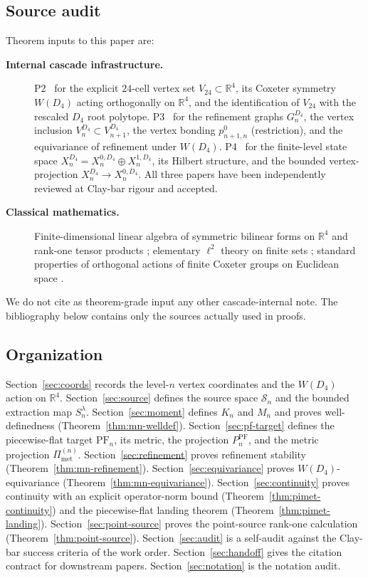 \documentclass[11pt, a4paper]{amsart}
\theoremstyle{definition}
\newcommand{\R}{\mathbb{R}}
\newcommand{\Met}{\mathrm{met}}
\newcommand{\PF}{\mathrm{PF}}
\newcommand{\Pimet}{\Pi_{\Met}}
\begin{document}
\subsection{Source audit}

Theorem inputs to this paper are:
\begin{description}
\item[\textbf{Internal cascade infrastructure.}]
P2~\cite{AlgebraicSubstrate} for the explicit $24$-cell vertex set
$V_{24} \subset \R^4$, its Coxeter symmetry $W(D_4)$ acting
orthogonally on $\R^4$, and the identification of $V_{24}$ with
the rescaled $D_4$ root polytope. P3~\cite{RefinementSpaces} for
the refinement graphs $G_n^{D_4}$, the vertex inclusion
$V_n^{D_4} \subset V_{n+1}^{D_4}$, the vertex bonding
$p_{n+1, n}^0$ (restriction), and the equivariance of refinement
under $W(D_4)$. P4~\cite{ClosureDynamics} for the finite-level
state space $X_n^{D_4} = X_n^{0, D_4} \oplus X_n^{1, D_4}$, its
Hilbert structure, and the bounded vertex-projection
$X_n^{D_4} \to X_n^{0, D_4}$. All three papers have been
independently reviewed at Clay-bar rigour and accepted.
\item[\textbf{Classical mathematics.}]
Finite-dimensional linear algebra of symmetric bilinear forms on
$\R^4$ and rank-one tensor products \cite{HornJohnson}; elementary
$\ell^2$ theory on finite sets \cite{ReedSimonI}; standard
properties of orthogonal actions of finite Coxeter groups on
Euclidean space \cite{Humphreys}.
\end{description}
We do not cite as theorem-grade input any other cascade-internal
note. The bibliography below contains only the sources actually
used in proofs.

\subsection{Organization}

Section~\ref{sec:coords} records the level-$n$ vertex coordinates
and the $W(D_4)$ action on $\R^4$. Section~\ref{sec:source}
defines the source space $\mathcal S_n$ and the bounded extraction
map $S_n^\lambda$. Section~\ref{sec:moment} defines $K_n$ and $M_n$ and
proves well-definedness (Theorem~\ref{thm:mn-welldef}).
Section~\ref{sec:pf-target} defines the piecewise-flat target
$\PF_n$, its metric, the projection $P_n^\PF$, and the metric
projection $\Pimet^{(n)}$. Section~\ref{sec:refinement} proves
refinement stability (Theorem~\ref{thm:mn-refinement}).
Section~\ref{sec:equivariance} proves $W(D_4)$-equivariance
(Theorem~\ref{thm:mn-equivariance}).
Section~\ref{sec:continuity} proves continuity with an explicit
operator-norm bound (Theorem~\ref{thm:pimet-continuity}) and the
piecewise-flat landing theorem
(Theorem~\ref{thm:pimet-landing}). Section~\ref{sec:point-source}
proves the point-source rank-one calculation
(Theorem~\ref{thm:point-source}). Section~\ref{sec:audit} is a
self-audit against the Clay-bar success criteria of the work
order. Section~\ref{sec:handoff} gives the citation contract for
downstream papers. Section~\ref{sec:notation} is the notation
audit.
\end{document}
